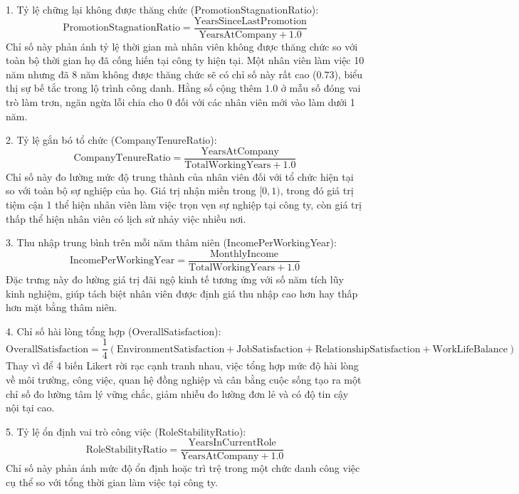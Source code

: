 \documentclass[12pt,a4paper]{article}
\begin{document}
1. Tỷ lệ chững lại không được thăng chức (PromotionStagnationRatio):
\begin{equation}
\text{PromotionStagnationRatio} = \frac{\text{YearsSinceLastPromotion}}{\text{YearsAtCompany} + 1.0}
\end{equation}
Chỉ số này phản ánh tỷ lệ thời gian mà nhân viên không được thăng chức so với toàn bộ thời gian họ đã cống hiến tại công ty hiện tại. Một nhân viên làm việc 10 năm nhưng đã 8 năm không được thăng chức sẽ có chỉ số này rất cao ($0.73$), biểu thị sự bế tắc trong lộ trình công danh. Hằng số cộng thêm $1.0$ ở mẫu số đóng vai trò làm trơn, ngăn ngừa lỗi chia cho 0 đối với các nhân viên mới vào làm dưới 1 năm.

2. Tỷ lệ gắn bó tổ chức (CompanyTenureRatio):
\begin{equation}
\text{CompanyTenureRatio} = \frac{\text{YearsAtCompany}}{\text{TotalWorkingYears} + 1.0}
\end{equation}
Chỉ số này đo lường mức độ trung thành của nhân viên đối với tổ chức hiện tại so với toàn bộ sự nghiệp của họ. Giá trị nhận miền trong $[0, 1)$, trong đó giá trị tiệm cận 1 thể hiện nhân viên làm việc trọn vẹn sự nghiệp tại công ty, còn giá trị thấp thể hiện nhân viên có lịch sử nhảy việc nhiều nơi.

3. Thu nhập trung bình trên mỗi năm thâm niên (IncomePerWorkingYear):
\begin{equation}
\text{IncomePerWorkingYear} = \frac{\text{MonthlyIncome}}{\text{TotalWorkingYears} + 1.0}
\end{equation}
Đặc trưng này đo lường giá trị đãi ngộ kinh tế tương ứng với số năm tích lũy kinh nghiệm, giúp tách biệt nhân viên được định giá thu nhập cao hơn hay thấp hơn mặt bằng thâm niên.

4. Chỉ số hài lòng tổng hợp (OverallSatisfaction):
\begin{equation}
\text{OverallSatisfaction} = \frac{1}{4}\left(\text{EnvironmentSatisfaction} + \text{JobSatisfaction} + \text{RelationshipSatisfaction} + \text{WorkLifeBalance}\right)
\end{equation}
Thay vì để 4 biến Likert rời rạc cạnh tranh nhau, việc tổng hợp mức độ hài lòng về môi trường, công việc, quan hệ đồng nghiệp và cân bằng cuộc sống tạo ra một chỉ số đo lường tâm lý vững chắc, giảm nhiễu đo lường đơn lẻ và có độ tin cậy nội tại cao.

5. Tỷ lệ ổn định vai trò công việc (RoleStabilityRatio):
\begin{equation}
\text{RoleStabilityRatio} = \frac{\text{YearsInCurrentRole}}{\text{YearsAtCompany} + 1.0}
\end{equation}
Chỉ số này phản ánh mức độ ổn định hoặc trì trệ trong một chức danh công việc cụ thể so với tổng thời gian làm việc tại công ty.
\end{document}
